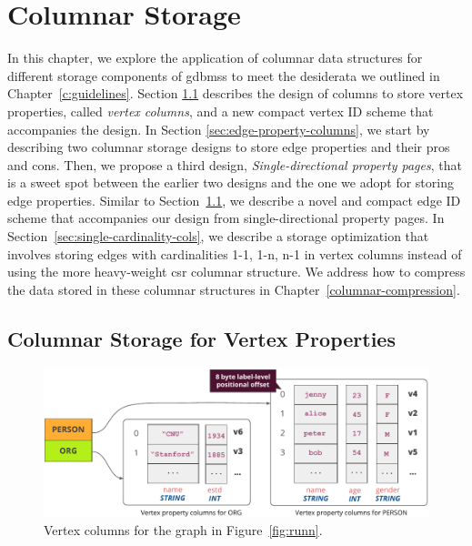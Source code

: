 \chapter{Columnar Storage}
\label{c:columnar-storage}

In this chapter, we explore the application of columnar data structures for different storage components of  \gls{gdbms}s to meet the desiderata we outlined in Chapter~\ref{c:guidelines}. Section \ref{sec:vertex-property-columns} describes the design of columns to store vertex properties, called \emph{vertex columns}, and a new compact vertex ID scheme that accompanies the design. In Section \ref{sec:edge-property-columns}, we start by describing two columnar storage designs to store edge properties and their pros and cons. Then, we propose a third design, \emph{Single-directional property pages}, that is a sweet spot between the earlier two designs and the one we adopt for storing edge properties. Similar to Section~\ref{sec:vertex-property-columns}, we describe a novel and compact edge ID scheme that accompanies our design from single-directional property pages. In Section~\ref{sec:single-cardinality-cols}, we describe a storage optimization that involves storing edges with cardinalities 1-1, 1-n, n-1 in vertex columns instead of using the more heavy-weight \gls{csr} columnar structure. We address how to compress the data stored in these columnar structures in Chapter~\ref{columnar-compression}.

\section{Columnar Storage for Vertex Properties}
\label{sec:vertex-property-columns}

\begin{figure}
	\hfill\includegraphics[scale=0.85]{img/vpcols}\hspace*{\fill}
	\caption{Vertex columns for the graph in Figure~\ref{fig:runn}.}
	\label{fig:vpcols}
\end{figure}

